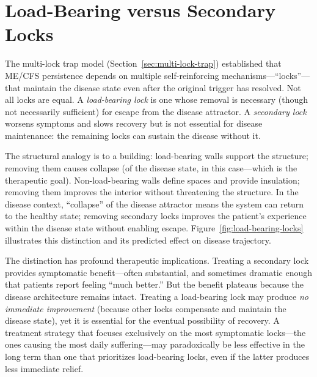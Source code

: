
\section{Load-Bearing versus Secondary Locks}
\label{sec:load-bearing-locks}

The multi-lock trap model (Section~\ref{sec:multi-lock-trap}) established that ME/CFS persistence depends on multiple self-reinforcing mechanisms---``locks''---that maintain the disease state even after the original trigger has resolved. Not all locks are equal. A \emph{load-bearing lock} is one whose removal is necessary (though not necessarily sufficient) for escape from the disease attractor. A \emph{secondary lock} worsens symptoms and slows recovery but is not essential for disease maintenance: the remaining locks can sustain the disease without it.

The structural analogy is to a building: load-bearing walls support the structure; removing them causes collapse (of the disease state, in this case---which is the therapeutic goal). Non-load-bearing walls define spaces and provide insulation; removing them improves the interior without threatening the structure. In the disease context, ``collapse'' of the disease attractor means the system can return to the healthy state; removing secondary locks improves the patient's experience within the disease state without enabling escape. Figure~\ref{fig:load-bearing-locks} illustrates this distinction and its predicted effect on disease trajectory.



The distinction has profound therapeutic implications. Treating a secondary lock provides symptomatic benefit---often substantial, and sometimes dramatic enough that patients report feeling ``much better.'' But the benefit plateaus because the disease architecture remains intact. Treating a load-bearing lock may produce \emph{no immediate improvement} (because other locks compensate and maintain the disease state), yet it is essential for the eventual possibility of recovery. A treatment strategy that focuses exclusively on the most symptomatic locks---the ones causing the most daily suffering---may paradoxically be less effective in the long term than one that prioritizes load-bearing locks, even if the latter produces less immediate relief.

